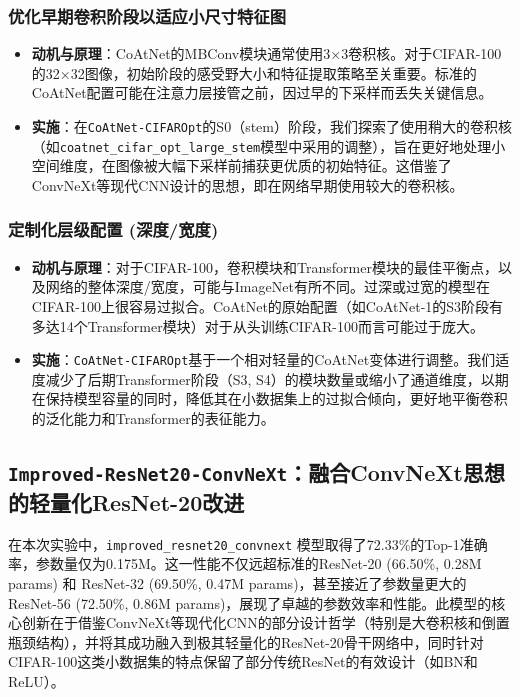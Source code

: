 \documentclass[a4paper]{article}
\begin{document}
\subsubsection{优化早期卷积阶段以适应小尺寸特征图}
\begin{itemize}
    \item \textbf{动机与原理}：CoAtNet的MBConv模块通常使用3×3卷积核。对于CIFAR-100的32×32图像，初始阶段的感受野大小和特征提取策略至关重要。标准的CoAtNet配置可能在注意力层接管之前，因过早的下采样而丢失关键信息。
    \item \textbf{实施}：在\texttt{CoAtNet-CIFAROpt}的S0（stem）阶段，我们探索了使用稍大的卷积核（如\texttt{coatnet\_cifar\_opt\_large\_stem}模型中采用的调整），旨在更好地处理小空间维度，在图像被大幅下采样前捕获更优质的初始特征。这借鉴了ConvNeXt等现代CNN设计的思想，即在网络早期使用较大的卷积核。
\end{itemize}

\subsubsection{定制化层级配置 (深度/宽度)}
\begin{itemize}
    \item \textbf{动机与原理}：对于CIFAR-100，卷积模块和Transformer模块的最佳平衡点，以及网络的整体深度/宽度，可能与ImageNet有所不同。过深或过宽的模型在CIFAR-100上很容易过拟合。CoAtNet的原始配置（如CoAtNet-1的S3阶段有多达14个Transformer模块）对于从头训练CIFAR-100而言可能过于庞大。
    \item \textbf{实施}：\texttt{CoAtNet-CIFAROpt}基于一个相对轻量的CoAtNet变体进行调整。我们适度减少了后期Transformer阶段（S3, S4）的模块数量或缩小了通道维度，以期在保持模型容量的同时，降低其在小数据集上的过拟合倾向，更好地平衡卷积的泛化能力和Transformer的表征能力。
\end{itemize}

\subsection{\texttt{Improved-ResNet20-ConvNeXt}：融合ConvNeXt思想的轻量化ResNet-20改进}

在本次实验中，\texttt{improved\_resnet20\_convnext} 模型取得了72.33\%的Top-1准确率，参数量仅为0.175M。这一性能不仅远超标准的ResNet-20 (66.50\%, 0.28M params) 和 ResNet-32 (69.50\%, 0.47M params)，甚至接近了参数量更大的ResNet-56 (72.50\%, 0.86M params)，展现了卓越的参数效率和性能。此模型的核心创新在于借鉴ConvNeXt等现代化CNN的部分设计哲学（特别是大卷积核和倒置瓶颈结构），并将其成功融入到极其轻量化的ResNet-20骨干网络中，同时针对CIFAR-100这类小数据集的特点保留了部分传统ResNet的有效设计（如BN和ReLU）。
\end{document}
